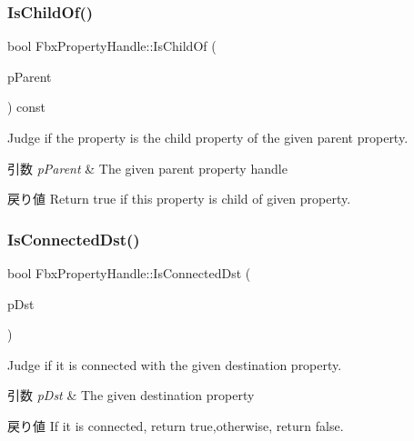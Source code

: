 \subsubsection{\texorpdfstring{Is\+Child\+Of()}{IsChildOf()}}
{\footnotesize\ttfamily bool Fbx\+Property\+Handle\+::\+Is\+Child\+Of (\begin{DoxyParamCaption}\item[{const \hyperlink{class_fbx_property_handle}{Fbx\+Property\+Handle} \&}]{p\+Parent }\end{DoxyParamCaption}) const}

Judge if the property is the child property of the given parent property. 
\begin{DoxyParams}{引数}
{\em p\+Parent} & The given parent property handle \\
\hline
\end{DoxyParams}
\begin{DoxyReturn}{戻り値}
Return true if this property is child of given property. 
\end{DoxyReturn}
\mbox{\label{class_fbx_property_handle_adf42d55aa7e6ce3f4389c73fe45f4adc}} 
\subsubsection{\texorpdfstring{Is\+Connected\+Dst()}{IsConnectedDst()}}
{\footnotesize\ttfamily bool Fbx\+Property\+Handle\+::\+Is\+Connected\+Dst (\begin{DoxyParamCaption}\item[{const \hyperlink{class_fbx_property_handle}{Fbx\+Property\+Handle} \&}]{p\+Dst }\end{DoxyParamCaption})}

Judge if it is connected with the given destination property. 
\begin{DoxyParams}{引数}
{\em p\+Dst} & The given destination property \\
\hline
\end{DoxyParams}
\begin{DoxyReturn}{戻り値}
If it is connected, return true,otherwise, return false. 
\end{DoxyReturn}
\mbox{\label{class_fbx_property_handle_acf4c1984ce8574d2cb6e1300d4d3d1d6}} 
